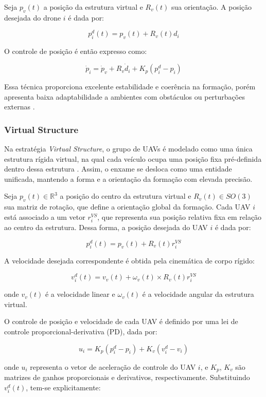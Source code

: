 \documentclass[portuguese]{sbcreviews-2025}%
\begin{document}
Seja $p_v(t)$ a posição da estrutura virtual e $R_v(t)$ sua orientação. A posição desejada do drone $i$ é dada por:

\[
p_i^d(t) = p_v(t) + R_v(t)d_i
\]

O controle de posição é então expresso como:

\[
\dot{p}_i = \dot{p}_v + R_v \dot{d}_i + K_p (p_i^d - p_i)
\]

Essa técnica proporciona excelente estabilidade e coerência na formação, porém apresenta baixa adaptabilidade a ambientes com obstáculos ou perturbações externas \cite{bu2024advancement, ouyang2023formation}.


\subsubsection{Virtual Structure}

Na estratégia \textit{Virtual Structure}, o grupo de UAVs é modelado como uma única estrutura rígida virtual, na qual cada veículo ocupa uma posição fixa pré-definida dentro dessa estrutura \cite{bu2024advancement}. Assim, o enxame se desloca como uma entidade unificada, mantendo a forma e a orientação da formação com elevada precisão.

Seja $p_v(t) \in \mathbb{R}^3$ a posição do centro da estrutura virtual e $R_v(t) \in SO(3)$ sua matriz de rotação, que define a orientação global da formação. Cada UAV $i$ está associado a um vetor $r_i^{VS}$, que representa sua posição relativa fixa em relação ao centro da estrutura. Dessa forma, a posição desejada do UAV $i$ é dada por:

\[
p_i^{d}(t) = p_v(t) + R_v(t) r_i^{VS}
\]

A velocidade desejada correspondente é obtida pela cinemática de corpo rígido:

\[
v_i^{d}(t) = v_v(t) + \omega_v(t) \times R_v(t) r_i^{VS}
\]

onde $v_v(t)$ é a velocidade linear e $\omega_v(t)$ é a velocidade angular da estrutura virtual. 

O controle de posição e velocidade de cada UAV é definido por uma lei de controle proporcional-derivativa (PD), dada por:

\[
u_i = K_p (p_i^{d} - p_i) + K_v (v_i^{d} - v_i)
\]

onde $u_i$ representa o vetor de aceleração de controle do UAV $i$, e $K_p$, $K_v$ são matrizes de ganhos proporcionais e derivativos, respectivamente. Substituindo $v_i^{d}(t)$, tem-se explicitamente:
\end{document}
